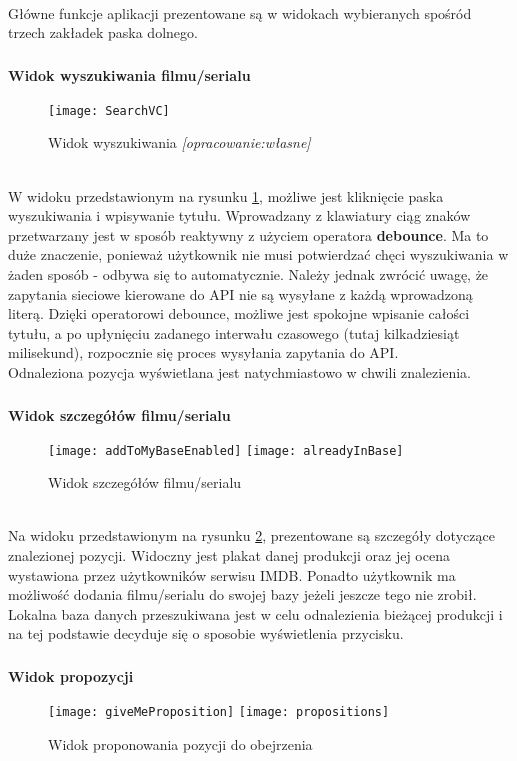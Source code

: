 \documentclass[12pt,oneside,a4paper]{report}
\begin{document}
\paragraph{}Główne funkcje aplikacji prezentowane są w widokach wybieranych spośród trzech zakładek paska dolnego.
\subparagraph{}\textbf{Widok wyszukiwania filmu/serialu}
\begin{figure}[ht!]
	\centering
	\texttt{[image: SearchVC]}
	\caption{Widok wyszukiwania
		\textit{[opracowanie:własne]}}
	\label{SearchVC}
\end{figure}\\
W widoku przedstawionym na rysunku \ref{SearchVC}, możliwe jest kliknięcie paska wyszukiwania i wpisywanie tytułu. Wprowadzany z klawiatury ciąg znaków przetwarzany jest w sposób reaktywny z użyciem operatora \textbf{debounce}. Ma to duże znaczenie, ponieważ użytkownik nie musi potwierdzać chęci wyszukiwania w żaden sposób - odbywa się to automatycznie. Należy jednak zwrócić uwagę, że zapytania sieciowe kierowane do API nie są wysyłane z każdą wprowadzoną literą. Dzięki operatorowi debounce, możliwe jest spokojne wpisanie całości tytułu, a po upłynięciu zadanego interwału czasowego (tutaj kilkadziesiąt milisekund), rozpocznie się proces wysyłania zapytania do API.\\
Odnaleziona pozycja wyświetlana jest natychmiastowo w chwili znalezienia.
\subparagraph{}\textbf{Widok szczegółów filmu/serialu}
\begin{figure}[ht!]
	\centering
	\subfloat[]{}
	\texttt{[image: addToMyBaseEnabled]}
	\quad
	\subfloat[]{}
	\texttt{[image: alreadyInBase]}
	\caption{Widok szczegółów  filmu/serialu}
	\label{watchableDetails}
\end{figure}\\
Na widoku przedstawionym na rysunku \ref{watchableDetails}, prezentowane są szczegóły dotyczące znalezionej pozycji. Widoczny jest plakat danej produkcji oraz jej ocena wystawiona przez użytkowników serwisu IMDB. Ponadto użytkownik ma możliwość dodania filmu/serialu do swojej bazy jeżeli jeszcze tego nie zrobił. Lokalna baza danych przeszukiwana jest w celu odnalezienia bieżącej produkcji i na tej podstawie decyduje się o sposobie wyświetlenia przycisku.
\pagebreak
\subparagraph{}\textbf{Widok propozycji}
\begin{figure}[ht!]
	\centering
	\subfloat[]{}
	\texttt{[image: giveMeProposition]}
	\quad
	\subfloat[]{}
	\texttt{[image: propositions]}
	\caption{Widok proponowania pozycji do obejrzenia}
	\label{proposition}
\end{figure}\\
\end{document}
